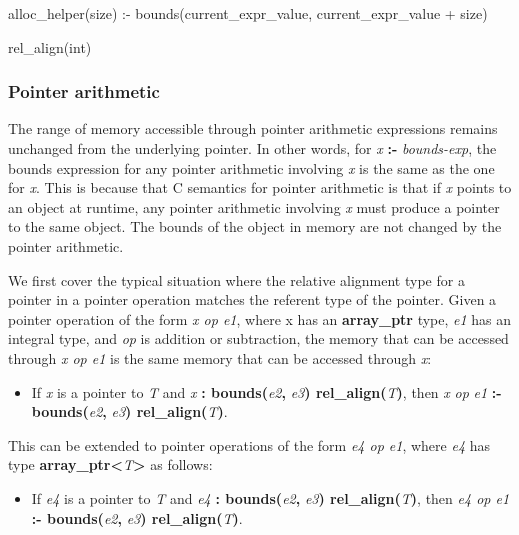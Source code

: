 \documentclass[]{article}
\begin{document}
alloc\_helper(size) :- bounds(current\_expr\_value, current\_expr\_value
+ size)

rel\_align(int)

\subsubsection{\texorpdfstring{\protect\hypertarget{ux5fToc435434953}{}{\protect\hypertarget{ux5fToc437460779}{}{\protect\hypertarget{ux5fToc440445458}{}{\protect\hypertarget{ux5fToc440449240}{}{\protect\hypertarget{ux5fToc440551890}{}{}}}}}Pointer
arithmetic}{Pointer arithmetic}}\label{pointer-arithmetic}

The range of memory accessible through pointer arithmetic expressions
remains unchanged from the underlying pointer. In other words, for
\emph{x} \textbf{:-} \emph{bounds-exp}, the bounds expression for any
pointer arithmetic involving \emph{x} is the same as the one for
\emph{x}. This is because that C semantics for pointer arithmetic is
that if \emph{x} points to an object at runtime, any pointer arithmetic
involving \emph{x} must produce a pointer to the same object. The bounds
of the object in memory are not changed by the pointer arithmetic.

We first cover the typical situation where the relative alignment type
for a pointer in a pointer operation matches the referent type of the
pointer. Given a pointer operation of the form \emph{x op e1}, where x
has an \textbf{array\_ptr} type, \emph{e1} has an integral type, and
\emph{op} is addition or subtraction, the memory that can be accessed
through \emph{x op e1} is the same memory that can be accessed through
\emph{x}:

\begin{itemize}
\item
  If \emph{x} is a pointer to \emph{T} and \emph{x} \textbf{:
  bounds(}\emph{e2}\textbf{,} \emph{e3}\textbf{)
  rel\_align(}\emph{T}\textbf{)}, then \emph{x} \emph{op} \emph{e1}
  \textbf{:- bounds(}\emph{e2}\textbf{,} \emph{e3}\textbf{)
  rel\_align(}\emph{T}\textbf{)}.
\end{itemize}

This can be extended to pointer operations of the form \emph{e4 op e1},
where \emph{e4} has type
\textbf{array\_ptr\textless{}}\emph{T}\textbf{\textgreater{}} as
follows:

\begin{itemize}
\item
  If \emph{e4} is a pointer to \emph{T} and \emph{e4} \textbf{:
  bounds(}\emph{e2}\textbf{,} \emph{e3}\textbf{)
  rel\_align(}\emph{T}\textbf{)}, then \emph{e4 op e1} \textbf{:-
  bounds(}\emph{e2}\textbf{,} \emph{e3}\textbf{)
  rel\_align(}\emph{T}\textbf{)}.
\end{itemize}
\end{document}
